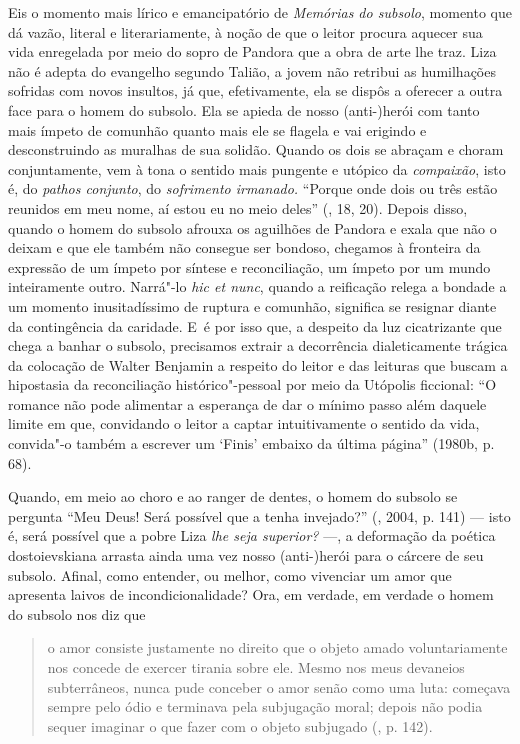 Eis o momento mais lírico e emancipatório de \emph{Memórias do subsolo},
momento que dá vazão, literal e literariamente, à noção de que o leitor
procura aquecer sua vida enregelada por meio do sopro de Pandora que a
obra de arte lhe traz. Liza não é adepta do evangelho segundo Talião, a
jovem não retribui as humilhações sofridas com novos insultos, já que,
efetivamente, ela se dispôs a oferecer a outra face para o homem do
subsolo. Ela se apieda de nosso \mbox{(anti-)herói} com tanto mais ímpeto de
comunhão quanto mais ele se flagela e vai erigindo e desconstruindo as
muralhas de sua solidão. Quando os dois se abraçam e choram
conjuntamente, vem à tona o sentido mais pungente e utópico da
\emph{compaixão}, isto é, do \emph{pathos conjunto}, do \emph{sofrimento
irmanado.} ``Porque onde dois ou três estão reunidos em meu nome, aí
estou eu no meio deles'' (, 18, 20). Depois disso, quando o homem
do subsolo afrouxa os aguilhões de Pandora e exala que não o deixam e
que ele também não consegue ser bondoso, chegamos à fronteira da
expressão de um ímpeto por síntese e reconciliação, um ímpeto por um
mundo inteiramente outro. Narrá"-lo \emph{hic et nunc}, quando a
reificação relega a bondade a um momento inusitadíssimo de ruptura e
comunhão, significa se resignar diante da contingência da caridade. E~é
por isso que, a despeito da luz cicatrizante que chega a banhar o
subsolo, precisamos extrair a decorrência dialeticamente trágica da
colocação de Walter Benjamin a respeito do leitor e das leituras que
buscam a hipostasia da reconciliação histórico"-pessoal por meio da
Utópolis ficcional: ``O romance não pode alimentar a esperança de dar o
mínimo passo além daquele limite em que, convidando o leitor a captar
intuitivamente o sentido da vida, convida"-o também a escrever um `Finis'
embaixo da última página'' (1980b, p. 68).

Quando, em meio ao choro e ao ranger de dentes, o homem do subsolo se
pergunta ``Meu Deus! Será possível que a tenha invejado?'' (,
2004, p. 141) --- isto é, será possível que a pobre Liza \emph{lhe seja
superior?} ---, a deformação da poética dostoievskiana arrasta ainda uma
vez nosso \mbox{(anti-)herói} para o cárcere de seu subsolo. Afinal, como
entender, ou melhor, como vivenciar um amor que apresenta laivos de
incondicionalidade? Ora, em verdade, em verdade o homem do subsolo nos
diz que

\begin{quote}
o amor consiste justamente no direito que o objeto amado voluntariamente
nos concede de exercer tirania sobre ele. Mesmo nos meus devaneios
subterrâneos, nunca pude conceber o amor senão como uma luta: começava
sempre pelo ódio e terminava pela subjugação moral; depois não podia
sequer imaginar o que fazer com o objeto subjugado (, p. 142).
\end{quote}

